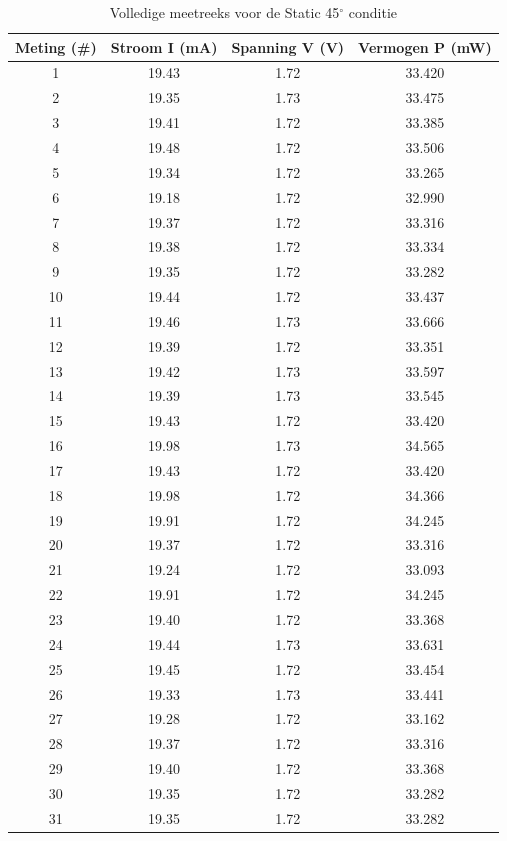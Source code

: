 \begin{table}[htbp]
\centering
\caption{Volledige meetreeks voor de Static 45$^\circ$ conditie}
\label{tab:static_45deg_data}
\begin{tabular}{c S[table-format=2.2] S[table-format=1.2] S[table-format=2.3]}
\toprule
\textbf{Meting (\#)} & {\textbf{Stroom I (mA)}} & {\textbf{Spanning V (V)}} & {\textbf{Vermogen P (mW)}} \\
  & 19.43 & 1.72 & 33.420 \\
2  & 19.35 & 1.73 & 33.475 \\
3  & 19.41 & 1.72 & 33.385 \\
4  & 19.48 & 1.72 & 33.506 \\
5  & 19.34 & 1.72 & 33.265 \\
6  & 19.18 & 1.72 & 32.990 \\
7  & 19.37 & 1.72 & 33.316 \\
8  & 19.38 & 1.72 & 33.334 \\
9  & 19.35 & 1.72 & 33.282 \\
10 & 19.44 & 1.72 & 33.437 \\
11 & 19.46 & 1.73 & 33.666 \\
12 & 19.39 & 1.72 & 33.351 \\
13 & 19.42 & 1.73 & 33.597 \\
14 & 19.39 & 1.73 & 33.545 \\
15 & 19.43 & 1.72 & 33.420 \\
16 & 19.98 & 1.73 & 34.565 \\
17 & 19.43 & 1.72 & 33.420 \\
18 & 19.98 & 1.72 & 34.366 \\
19 & 19.91 & 1.72 & 34.245 \\
20 & 19.37 & 1.72 & 33.316 \\
21 & 19.24 & 1.72 & 33.093 \\
22 & 19.91 & 1.72 & 34.245 \\
23 & 19.40 & 1.72 & 33.368 \\
24 & 19.44 & 1.73 & 33.631 \\
25 & 19.45 & 1.72 & 33.454 \\
26 & 19.33 & 1.73 & 33.441 \\
27 & 19.28 & 1.72 & 33.162 \\
28 & 19.37 & 1.72 & 33.316 \\
29 & 19.40 & 1.72 & 33.368 \\
30 & 19.35 & 1.72 & 33.282 \\
31 & 19.35 & 1.72 & 33.282 \\

\end{tabular}
\end{table}
